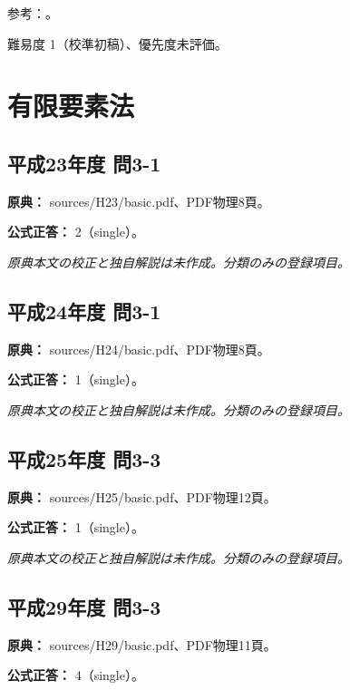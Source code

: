\par 参考：\cite{nist_quadrature}。

\par 難易度 1（校準初稿）、優先度未評価。

\section{有限要素法}

\subsection{平成23年度 問3-1}
\label{q:h23-reg-basic-3-1}

\noindent\textbf{原典：} sources/H23/basic.pdf、PDF物理8頁。

\textbf{公式正答：} 2（single）。

\par\textit{原典本文の校正と独自解説は未作成。分類のみの登録項目。}

\subsection{平成24年度 問3-1}
\label{q:h24-reg-basic-3-1}

\noindent\textbf{原典：} sources/H24/basic.pdf、PDF物理8頁。

\textbf{公式正答：} 1（single）。

\par\textit{原典本文の校正と独自解説は未作成。分類のみの登録項目。}

\subsection{平成25年度 問3-3}
\label{q:h25-reg-basic-3-3}

\noindent\textbf{原典：} sources/H25/basic.pdf、PDF物理12頁。

\textbf{公式正答：} 1（single）。

\par\textit{原典本文の校正と独自解説は未作成。分類のみの登録項目。}

\subsection{平成29年度 問3-3}
\label{q:h29-reg-basic-3-3}

\noindent\textbf{原典：} sources/H29/basic.pdf、PDF物理11頁。

\textbf{公式正答：} 4（single）。

